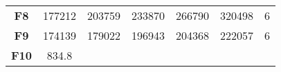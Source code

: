 \documentclass[12pt,a4paper]{article}
\begin{document}
\begin{longtable}[c]{@{}ccccccc@{}}
\begin{minipage}[t]{0.11\columnwidth}\centering\strut
\textbf{F8}
\strut\end{minipage} &
\begin{minipage}[t]{0.08\columnwidth}\centering\strut
177212
\strut\end{minipage} &
\begin{minipage}[t]{0.08\columnwidth}\centering\strut
203759
\strut\end{minipage} &
\begin{minipage}[t]{0.09\columnwidth}\centering\strut
233870
\strut\end{minipage} &
\begin{minipage}[t]{0.10\columnwidth}\centering\strut
266790
\strut\end{minipage} &
\begin{minipage}[t]{0.11\columnwidth}\centering\strut
320498
\strut\end{minipage} &
\begin{minipage}[t]{0.07\columnwidth}\centering\strut
6
\strut\end{minipage}\tabularnewline
\begin{minipage}[t]{0.11\columnwidth}\centering\strut
\textbf{F9}
\strut\end{minipage} &
\begin{minipage}[t]{0.08\columnwidth}\centering\strut
174139
\strut\end{minipage} &
\begin{minipage}[t]{0.08\columnwidth}\centering\strut
179022
\strut\end{minipage} &
\begin{minipage}[t]{0.09\columnwidth}\centering\strut
196943
\strut\end{minipage} &
\begin{minipage}[t]{0.10\columnwidth}\centering\strut
204368
\strut\end{minipage} &
\begin{minipage}[t]{0.11\columnwidth}\centering\strut
222057
\strut\end{minipage} &
\begin{minipage}[t]{0.07\columnwidth}\centering\strut
6
\strut\end{minipage}\tabularnewline
\begin{minipage}[t]{0.11\columnwidth}\centering\strut
\textbf{F10}
\strut\end{minipage} &
\begin{minipage}[t]{0.08\columnwidth}\centering\strut
834.8
\strut\end{minipage} &

\end{longtable}
\end{document}
